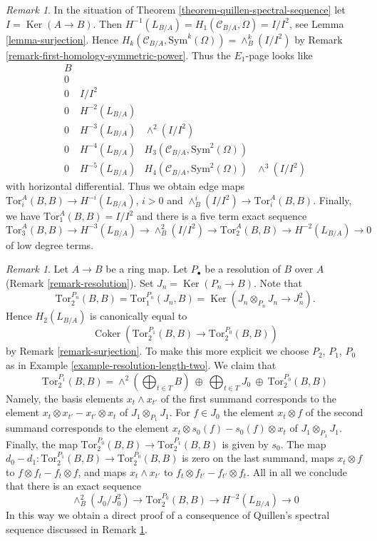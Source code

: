 \documentclass{stacks-project}
\theoremstyle{plain}
\theoremstyle{definition}
\theoremstyle{remark}
\newtheorem{remark}[subsection]{Remark}
\numberwithin{equation}{subsection}
\def\Ker{\mathop{\mathrm{Ker}}}
\def\Coker{\mathop{\mathrm{Coker}}}
\begin{document}
\begin{remark}
\label{remark-elucidate-ss}
In the situation of Theorem \ref{theorem-quillen-spectral-sequence}
let $I = \Ker(A \to B)$. Then
$H^{-1}(L_{B/A}) = H_1(\mathcal{C}_{B/A}, \Omega) = I/I^2$, see
Lemma \ref{lemma-surjection}.
Hence $H_k(\mathcal{C}_{B/A}, \text{Sym}^k(\Omega)) = \wedge^k_B(I/I^2)$ by
Remark \ref{remark-first-homology-symmetric-power}. Thus the
$E_1$-page looks like
$$
\begin{matrix}
B \\
0 \\
0 & I/I^2 \\
0 & H^{-2}(L_{B/A}) \\
0 & H^{-3}(L_{B/A}) & \wedge^2(I/I^2) \\
0 & H^{-4}(L_{B/A}) & H_3(\mathcal{C}_{B/A}, \text{Sym}^2(\Omega)) \\
0 & H^{-5}(L_{B/A}) & H_4(\mathcal{C}_{B/A}, \text{Sym}^2(\Omega)) &
\wedge^3(I/I^2)
\end{matrix}
$$
with horizontal differential. Thus we obtain edge maps
$\text{Tor}_i^A(B, B) \to H^{-i}(L_{B/A})$, $i > 0$ and
$\wedge^i_B(I/I^2) \to \text{Tor}_i^A(B, B)$. Finally, we have
$\text{Tor}_1^A(B, B) = I/I^2$ and there is a
five term exact sequence
$$
\text{Tor}_3^A(B, B) \to H^{-3}(L_{B/A}) \to \wedge^2_B(I/I^2) \to
\text{Tor}_2^A(B, B) \to H^{-2}(L_{B/A}) \to 0
$$
of low degree terms.
\end{remark}

\begin{remark}
\label{remark-elucidate-degree-two}
Let $A \to B$ be a ring map. Let $P_\bullet$ be a resolution of
$B$ over $A$ (Remark \ref{remark-resolution}).
Set $J_n = \Ker(P_n \to B)$. Note that
$$
\text{Tor}_2^{P_n}(B, B) = 
\text{Tor}_1^{P_n}(J_n, B) =
\Ker(J_n \otimes_{P_n} J_n \to J_n^2).
$$
Hence $H_2(L_{B/A})$ is canonically equal to
$$
\Coker(\text{Tor}_2^{P_1}(B, B) \to \text{Tor}_2^{P_0}(B, B))
$$
by Remark \ref{remark-surjection}. To make this more explicit we choose
$P_2$, $P_1$, $P_0$ as in Example \ref{example-resolution-length-two}.
We claim that
$$
\text{Tor}_2^{P_1}(B, B) =
\wedge^2(\bigoplus\nolimits_{t \in T} B)\ \oplus
\ \bigoplus\nolimits_{t \in T} J_0\ \oplus
\ \text{Tor}_2^{P_0}(B, B)
$$
Namely, the basis elements $x_t \wedge x_{t'}$ of the first summand
corresponds to the element $x_t \otimes x_{t'} - x_{t'} \otimes x_t$
of $J_1 \otimes_{P_1} J_1$. For $f \in J_0$ the element $x_t \otimes f$
of the second summand corresponds to the element
$x_t \otimes s_0(f) - s_0(f) \otimes x_t$ of $J_1 \otimes_{P_1} J_1$.
Finally, the map $\text{Tor}_2^{P_0}(B, B) \to \text{Tor}_2^{P_1}(B, B)$
is given by $s_0$. The map
$d_0 - d_1 : \text{Tor}_2^{P_1}(B, B) \to \text{Tor}_2^{P_0}(B, B)$
is zero on the last summand, maps $x_t \otimes f$ to
$f \otimes f_t - f_t \otimes f$, and maps $x_t \wedge x_{t'}$
to $f_t \otimes f_{t'} - f_{t'} \otimes f_t$. All in all we conclude
that there is an exact sequence
$$
\wedge^2_B(J_0/J_0^2) \to \text{Tor}_2^{P_0}(B, B) \to H^{-2}(L_{B/A}) \to 0
$$
In this way we obtain a direct proof of a consequence of Quillen's spectral
sequence discussed in Remark \ref{remark-elucidate-ss}.
\end{remark}
\end{document}
